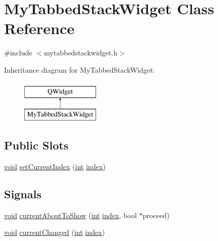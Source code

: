 \hypertarget{class_my_tabbed_stack_widget}{\section{My\-Tabbed\-Stack\-Widget Class Reference}
\label{class_my_tabbed_stack_widget}
}


{\ttfamily \#include $<$mytabbedstackwidget.\-h$>$}

Inheritance diagram for My\-Tabbed\-Stack\-Widget\-:\begin{figure}[H]
\begin{center}
\leavevmode
\includegraphics[height=2.000000cm]{class_my_tabbed_stack_widget}
\end{center}
\end{figure}
\subsection*{Public Slots}
\begin{DoxyCompactItemize}
\item 
\hyperlink{group___u_a_v_objects_plugin_ga444cf2ff3f0ecbe028adce838d373f5c}{void} \hyperlink{class_my_tabbed_stack_widget_a9e3c968779227ca412735073b437fdf1}{set\-Current\-Index} (\hyperlink{ioapi_8h_a787fa3cf048117ba7123753c1e74fcd6}{int} \hyperlink{glext_8h_ab47dd9958bcadea08866b42bf358e95e}{index})
\end{DoxyCompactItemize}
\subsection*{Signals}
\begin{DoxyCompactItemize}
\item 
\hyperlink{group___u_a_v_objects_plugin_ga444cf2ff3f0ecbe028adce838d373f5c}{void} \hyperlink{class_my_tabbed_stack_widget_a9f0e64fce4a1b4f26e9aa6fee22ab7f5}{current\-About\-To\-Show} (\hyperlink{ioapi_8h_a787fa3cf048117ba7123753c1e74fcd6}{int} \hyperlink{glext_8h_ab47dd9958bcadea08866b42bf358e95e}{index}, bool $\ast$proceed)
\item 
\hyperlink{group___u_a_v_objects_plugin_ga444cf2ff3f0ecbe028adce838d373f5c}{void} \hyperlink{class_my_tabbed_stack_widget_ab4617839c400d58c804ba6b86dc33cc1}{current\-Changed} (\hyperlink{ioapi_8h_a787fa3cf048117ba7123753c1e74fcd6}{int} \hyperlink{glext_8h_ab47dd9958bcadea08866b42bf358e95e}{index})
\end{DoxyCompactItemize}

